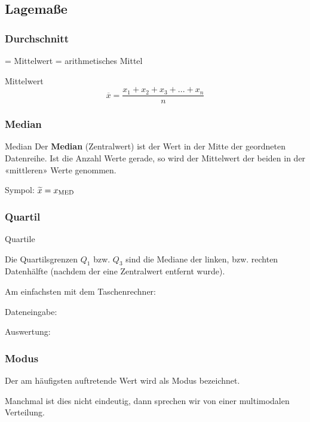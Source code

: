 \begin{multicols}{2}

\subsection{Lagemaße}
\subsubsection{Durchschnitt}
= Mittelwert = arithmetisches Mittel

\begin{definition}{Mittelwert}{}
$$\overline{x} = \frac{x_1 + x_2 + x_3 + ... + x_n}{n}$$
\end{definition}

\subsubsection{Median}
\begin{definition}{Median}{}
Der \textbf{Median} (Zentralwert) ist der Wert in der Mitte der geordneten Datenreihe. Ist
die Anzahl Werte gerade, so wird der Mittelwert der beiden in der
«mittleren» Werte genommen.

Sympol: $\widetilde{x} = x_{\textrm{MED}}$
\end{definition}

\subsubsection{Quartil}

\begin{rezept}{Quartile}{}

Die Quartilsgrenzen $Q_1$ bzw. $Q_3$ sind die Mediane der linken,
bzw. rechten Datenhälfte (nachdem der eine Zentralwert entfernt
wurde).

Am einfachsten mit dem Taschenrechner:

Dateneingabe: 

Auswertung: 
\end{rezept}

\subsubsection{Modus}
Der am häufigsten auftretende Wert wird als Modus bezeichnet.

Manchmal ist dies nicht eindeutig, dann sprechen wir von einer
multimodalen Verteilung.


\end{multicols}
